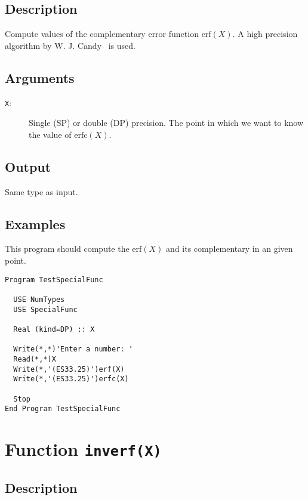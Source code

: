 \subsection{Description}

Compute values of the complementary error function $\text{erf}(X)$. A high
precision algorithm by W. J. Candy~\cite{cody:1969aa} is used.

\subsection{Arguments}

\begin{description}
\item[\texttt{X}:] Single (SP) or double (DP) precision. The point in
  which we want to know the value of $\text{erfc}(X)$.
\end{description}

\subsection{Output}

Same type as input.

\subsection{Examples}

This program should compute the $\text{erf}(X)$ and its complementary
in an given point.

\begin{lstlisting}[emph=erfc,
                   emphstyle=\color{blue},
                   frame=trBL,
                   caption=Computing the complementary Error Function.,
                   label=erfc]
Program TestSpecialFunc

  USE NumTypes
  USE SpecialFunc

  Real (kind=DP) :: X

  Write(*,*)'Enter a number: '
  Read(*,*)X
  Write(*,'(ES33.25)')erf(X)
  Write(*,'(ES33.25)')erfc(X)

  Stop
End Program TestSpecialFunc
\end{lstlisting}

\section{Function \texttt{inverf(X)}}

\subsection{Description}

